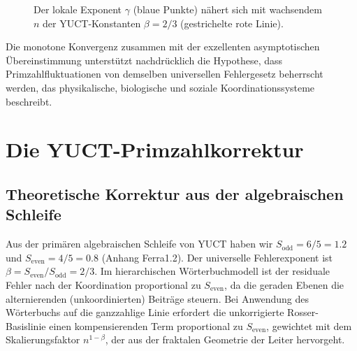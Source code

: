 \documentclass[11pt,a4paper]{article}
\newcommand{\Sodd}{S_{\mathrm{odd}}}
\newcommand{\Seven}{S_{\mathrm{even}}}
\begin{document}
	\begin{figure}[htbp]
		\centering
		\caption{Der lokale Exponent $\gamma$ (blaue Punkte) nähert sich mit wachsendem $n$ der YUCT-Konstanten $\beta = 2/3$ (gestrichelte rote Linie).}
		\label{fig:gamma-convergence}
	\end{figure}
	
	Die monotone Konvergenz zusammen mit der exzellenten asymptotischen Übereinstimmung unterstützt nachdrücklich die Hypothese, dass Primzahlfluktuationen von demselben universellen Fehlergesetz beherrscht werden, das physikalische, biologische und soziale Koordinationssysteme beschreibt.
	
	\section{Die YUCT-Primzahlkorrektur}
	\subsection{Theoretische Korrektur aus der algebraischen Schleife}
	Aus der primären algebraischen Schleife von YUCT haben wir \(\Sodd = 6/5 = 1.2\) und \(\Seven = 4/5 = 0.8\) (Anhang Ferra1.2). Der universelle Fehlerexponent ist \(\beta = \Seven/\Sodd = 2/3\). Im hierarchischen Wörterbuchmodell ist der residuale Fehler nach der Koordination proportional zu \(\Seven\), da die geraden Ebenen die alternierenden (unkoordinierten) Beiträge steuern. Bei Anwendung des Wörterbuchs auf die ganzzahlige Linie erfordert die unkorrigierte Rosser-Basislinie einen kompensierenden Term proportional zu \(\Seven\), gewichtet mit dem Skalierungsfaktor \(n^{1-\beta}\), der aus der fraktalen Geometrie der Leiter hervorgeht.
	
\end{document}
